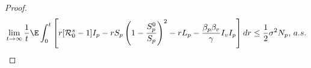 \begin{proof}
	\begin{align*}
		\lim_{t \to \infty}
			\frac{1}{t}
				\E \int_{0}^{t}
				\left[
					r [\mathcal{R}^s_0 - 1 ]
						I_p - rS_p
						\left(
							1 - \frac{S ^ 0_p }{ S_p }
						\right) ^ 2 -
						r L_p - 
						\frac{\beta_p\beta_v}{\gamma} I_vI_p
					\right]
					dr
					\leq 
					\frac{1}{2} \sigma ^ 2 N_p ,\, a.s.
	\end{align*}
\end{proof}

